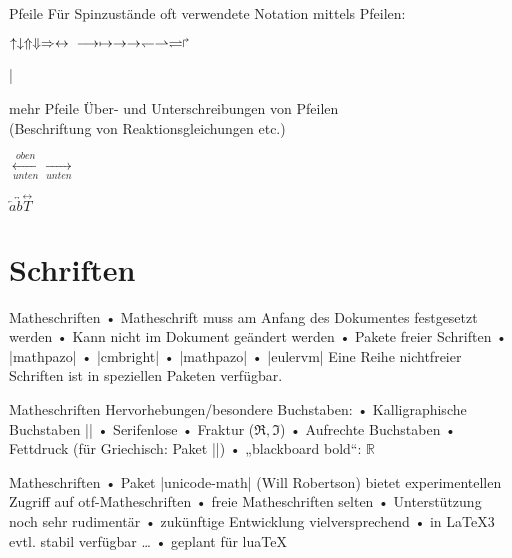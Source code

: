 \begin{frame}[fragile]{Pfeile}
Für Spinzustände oft verwendete Notation mittels Pfeilen:
\begin{LTXexample}[width=.4\textwidth]
$\uparrow \downarrow \Uparrow \Downarrow
\Rightarrow \leftrightarrow\\
\longrightarrow \mapsto \to \rightarrow
\leftharpoondown \rightharpoonup \rightleftharpoons
\Rsh$
\end{LTXexample}
\end{frame}

\MakeShortVerb|
\begin{frame}[fragile]{mehr Pfeile}
Über- und Unterschreibungen von Pfeilen\\ (Beschriftung von Reaktionsgleichungen etc.)
\begin{LTXexample}
$\xleftarrow[unten]{oben}
 \xrightarrow[unten]{}$
\end{LTXexample}
\begin{LTXexample}
$\overleftarrow a
\overleftrightarrow b
\stackrel\leftrightarrow T$
\end{LTXexample}
\end{frame}

\section{Schriften}
\begin{frame}[fragile]{Matheschriften}
• Matheschrift muss am Anfang des Dokumentes festgesetzt werden
• Kann nicht im Dokument geändert werden
• Pakete freier Schriften
• |mathpazo|
• |cmbright|
• |mathpazo|
• |eulervm|
\•
Eine Reihe nichtfreier Schriften ist in speziellen Paketen verfügbar.
\end{frame}

\begin{frame}[fragile]{Matheschriften}
Hervorhebungen/besondere Buchstaben:
• Kalligraphische Buchstaben |\mathcal|
• Serifenlose
• Fraktur ($\Re, \Im$)
• Aufrechte Buchstaben
• Fettdruck (für Griechisch: Paket |\bm|)
• „blackboard bold“: $\mathbb R$
\• 
\end{frame}

\begin{frame}[fragile]{Matheschriften}
• Paket |unicode-math| (Will Robertson) bietet experimentellen Zugriff auf otf-Matheschriften
• freie Matheschriften selten
• Unterstützung noch sehr rudimentär
• zukünftige Entwicklung vielversprechend
• in \LaTeX3 evtl. stabil verfügbar \dots
• geplant für lua\TeX
\•
\end{frame}

